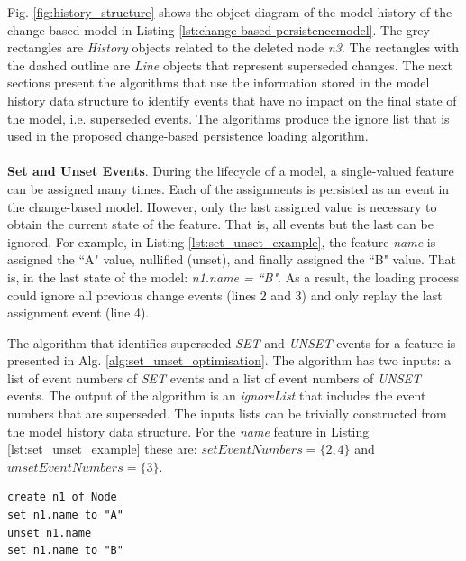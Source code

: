 \documentclass[12pt, a4paper]{report} \usepackage[titletoc]{appendix}
\begin{document}
Fig. \ref{fig:history_structure} shows the object diagram of the model history of the change-based model in Listing \ref{lst:change-based persistencemodel}. The grey rectangles are \emph{History} objects related to the deleted node \emph{n3}. The rectangles with the dashed outline are \emph{Line} objects that represent superseded changes. The next sections present the algorithms that use the information stored in the model history data structure to identify events that have no impact on the final state of the model, i.e. superseded events. The algorithms produce the ignore list that is used in the proposed change-based persistence loading algorithm.
\\\\
\textbf{Set and Unset Events}\label{subsec:set_and_unset_events}. During the lifecycle of a model, a single-valued feature can be assigned many times. Each of the assignments is persisted as an event in the change-based model. However, only the last assigned value is necessary to obtain the current state of the feature.  That is, all events but the last can be ignored. For example, in Listing \ref{lst:set_unset_example}, the feature \emph{name} is assigned the ``A" value, nullified (unset), and finally assigned the ``B" value. That is, in the last state of the model: \emph{n1.name = ``B"}. As a result, the loading process could ignore all previous change events (lines 2 and 3) and only replay the last assignment event (line 4). 

The algorithm that identifies superseded \emph{SET} and \emph{UNSET} events for a feature is presented in Alg. \ref{alg:set_unset_optimisation}. The algorithm has two inputs: a list of event numbers of \emph{SET} events and a list of event numbers of \emph{UNSET} events. The output of the algorithm is an \emph{ignoreList} that includes the event numbers that are superseded. The inputs lists can be trivially constructed from the model history data structure. For the \emph{name} feature in Listing \ref{lst:set_unset_example} these are: $setEventNumbers = \{2,4\}$ and $unsetEventNumbers = \{3\}$.

\begin{lstlisting}[style=eol,caption={The change-based persistence representation of attribute \emph{name} assignments.},label=lst:set_unset_example]
create n1 of Node
set n1.name to "A"
unset n1.name
set n1.name to "B"
\end{lstlisting}
\end{document}
